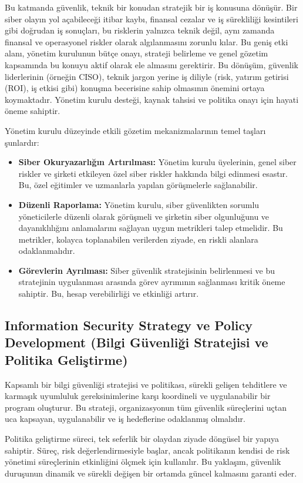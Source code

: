 Bu katmanda güvenlik, teknik bir konudan stratejik bir iş konusuna dönüşür. Bir siber olayın yol açabileceği itibar kaybı, finansal cezalar ve iş sürekliliği kesintileri gibi doğrudan iş sonuçları, bu risklerin yalnızca teknik değil, aynı zamanda finansal ve operasyonel riskler olarak algılanmasını zorunlu kılar. Bu geniş etki alanı, yönetim kurulunun bütçe onayı, strateji belirleme ve genel gözetim kapsamında bu konuyu aktif olarak ele almasını gerektirir. Bu dönüşüm, güvenlik liderlerinin (örneğin CISO), teknik jargon yerine iş diliyle (risk, yatırım getirisi (ROI), iş etkisi gibi) konuşma becerisine sahip olmasının önemini ortaya koymaktadır. Yönetim kurulu desteği, kaynak tahsisi ve politika onayı için hayati öneme sahiptir.

Yönetim kurulu düzeyinde etkili gözetim mekanizmalarının temel taşları şunlardır:
\begin{itemize}
    \item \textbf{Siber Okuryazarlığın Artırılması:} Yönetim kurulu üyelerinin, genel siber riskler ve şirketi etkileyen özel siber riskler hakkında bilgi edinmesi esastır. Bu, özel eğitimler ve uzmanlarla yapılan görüşmelerle sağlanabilir.
    \item \textbf{Düzenli Raporlama:} Yönetim kurulu, siber güvenlikten sorumlu yöneticilerle düzenli olarak görüşmeli ve şirketin siber olgunluğunu ve dayanıklılığını anlamalarını sağlayan uygun metrikleri talep etmelidir. Bu metrikler, kolayca toplanabilen verilerden ziyade, en riskli alanlara odaklanmalıdır.
    \item \textbf{Görevlerin Ayrılması:} Siber güvenlik stratejisinin belirlenmesi ve bu stratejinin uygulanması arasında görev ayrımının sağlanması kritik öneme sahiptir. Bu, hesap verebilirliği ve etkinliği artırır.
\end{itemize}

\subsection{Information Security Strategy ve Policy Development (Bilgi Güvenliği Stratejisi ve Politika Geliştirme)}

Kapsamlı bir bilgi güvenliği stratejisi ve politikası, sürekli gelişen tehditlere ve karmaşık uyumluluk gereksinimlerine karşı koordineli ve uygulanabilir bir program oluşturur. Bu strateji, organizasyonun tüm güvenlik süreçlerini uçtan uca kapsayan, uygulanabilir ve iş hedeflerine odaklanmış olmalıdır.

Politika geliştirme süreci, tek seferlik bir olaydan ziyade döngüsel bir yapıya sahiptir. Süreç, risk değerlendirmesiyle başlar, ancak politikanın kendisi de risk yönetimi süreçlerinin etkinliğini ölçmek için kullanılır. Bu yaklaşım, güvenlik duruşunun dinamik ve sürekli değişen bir ortamda güncel kalmasını garanti eder.

